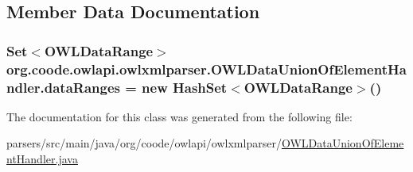 \subsection{Member Data Documentation}
\hypertarget{classorg_1_1coode_1_1owlapi_1_1owlxmlparser_1_1_o_w_l_data_union_of_element_handler_af1863a6e1d5983bc9995deef7c040fbb}{
\subsubsection[{data\-Ranges}]{\setlength{\rightskip}{0pt plus 5cm}Set$<${\bf O\-W\-L\-Data\-Range}$>$ org.\-coode.\-owlapi.\-owlxmlparser.\-O\-W\-L\-Data\-Union\-Of\-Element\-Handler.\-data\-Ranges = new Hash\-Set$<${\bf O\-W\-L\-Data\-Range}$>$()\hspace{0.3cm}{\ttfamily [private]}}}\label{classorg_1_1coode_1_1owlapi_1_1owlxmlparser_1_1_o_w_l_data_union_of_element_handler_af1863a6e1d5983bc9995deef7c040fbb}


The documentation for this class was generated from the following file\-:\begin{DoxyCompactItemize}
\item 
parsers/src/main/java/org/coode/owlapi/owlxmlparser/\hyperlink{_o_w_l_data_union_of_element_handler_8java}{O\-W\-L\-Data\-Union\-Of\-Element\-Handler.\-java}\end{DoxyCompactItemize}
